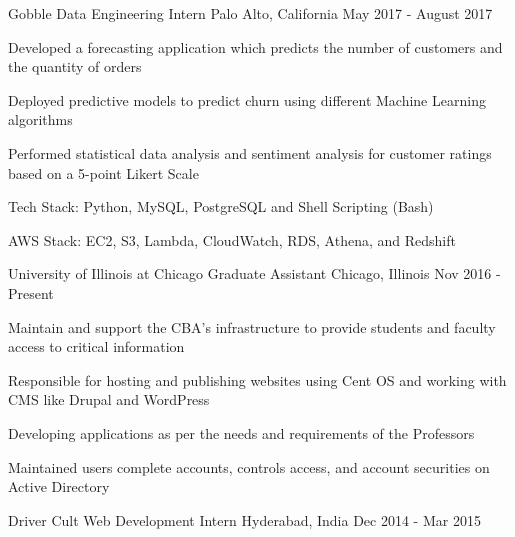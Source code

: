 \vspace{-4mm}
\vspace{-2mm}
\begin{cventries}
  \cventry
    {Gobble}
    {Data Engineering Intern\vspace{-2mm}}
    {Palo Alto, California\vspace{-2mm}}
    {May 2017 - August 2017}
    {
      \begin{cvitems}
        \item {Developed a forecasting application which predicts the number of customers and the quantity of orders}
        \item {Deployed predictive models to predict churn using different Machine Learning algorithms}
        \item {Performed statistical data analysis and sentiment analysis for customer ratings based on a 5-point Likert Scale}
        \item{Tech Stack: Python, MySQL, PostgreSQL and Shell Scripting (Bash)}
        \item{AWS Stack: EC2, S3, Lambda, CloudWatch, RDS, Athena, and Redshift\vspace{-2mm}}
      \end{cvitems}
    }
  \cventry
    {University of Illinois at Chicago}
    {Graduate Assistant\vspace{-2mm}}
    {Chicago, Illinois\vspace{-2mm}}
    {Nov 2016 - Present}
    {
      \begin{cvitems}
        \item {Maintain and support the CBA's infrastructure to provide students and faculty access to critical information}
        \item {Responsible for hosting and publishing websites using Cent OS and working with CMS like Drupal and WordPress}
        \item {Developing applications as per the needs and requirements of the Professors}
        \item {Maintained users complete accounts, controls access, and account securities on Active Directory\vspace{-2mm}}
      \end{cvitems}
    }
  \cventry
    {Driver Cult}
    {Web Development Intern\vspace{-2mm}}
    {Hyderabad, India\vspace{-2mm}}
    {Dec 2014 - Mar 2015}

\end{cventries}
